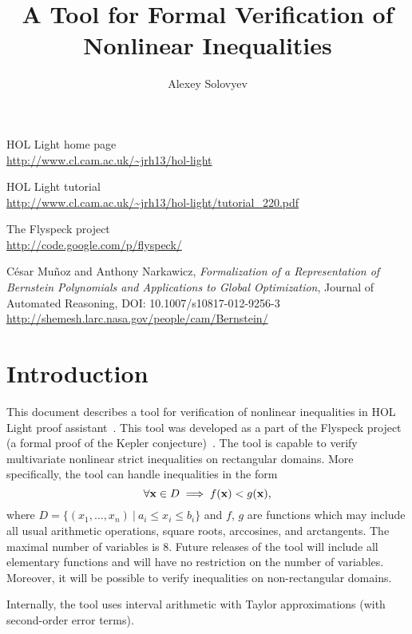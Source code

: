 \documentclass[a4paper]{article}
\title{A Tool for Formal Verification of Nonlinear Inequalities}
\author{Alexey Solovyev}
\begin{document}
\maketitle

\tableofcontents

\pagebreak
\begin{thebibliography}{9}
 HOL Light home page\\
        \url{http://www.cl.cam.ac.uk/~jrh13/hol-light}

 HOL Light tutorial\\
        \url{http://www.cl.cam.ac.uk/~jrh13/hol-light/tutorial_220.pdf}

 The Flyspeck project\\
        \url{http://code.google.com/p/flyspeck/}

C\'esar Mu\~noz and Anthony Narkawicz, {\it Formalization of a Representation of Bernstein Polynomials and Applications to Global Optimization}, Journal of Automated Reasoning, DOI: 10.1007/s10817-012-9256-3\\
        \url{http://shemesh.larc.nasa.gov/people/cam/Bernstein/}
\end{thebibliography}

\section{Introduction}
This document describes a tool for verification of nonlinear inequalities in HOL Light proof assistant~\cite{HOL, HOL-tutorial}. This tool was developed as a part of the Flyspeck project (a formal proof of the Kepler conjecture)~\cite{flyspeck}. The tool is capable to verify multivariate nonlinear strict inequalities on rectangular domains. More specifically, the tool can handle inequalities in the form
\[\forall {\bf x} \in D \implies f({\bf x}) < g({\bf x}),\]
where $D = \{(x_1, \ldots, x_n)\ |\ a_i \le x_i \le b_i\}$ and $f$, $g$ are functions which may include all usual arithmetic operations, square roots, arccosines, and arctangents. The maximal number of variables is 8. Future releases of the tool will include all elementary functions and will have no restriction on the number of variables. Moreover, it will be possible to verify inequalities on non-rectangular domains.

Internally, the tool uses interval arithmetic with Taylor approximations (with second-order error terms).
\end{document}
